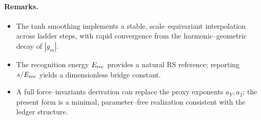 \documentclass[11pt]{article}
\begin{document}
\paragraph{Remarks.}
\begin{itemize}
  \item The tanh smoothing implements a stable, scale–equivariant interpolation across ladder steps, with rapid convergence from the harmonic–geometric decay of $|g_m|$.
  \item The recognition energy $E_{\rm rec}$ provides a natural RS reference; reporting $s/E_{\rm rec}$ yields a dimensionless bridge constant.
  \item A full force–invariants derivation can replace the proxy exponents $a_Y,a_2$; the present form is a minimal, parameter–free realization consistent with the ledger structure.
\end{itemize}
\end{document}

